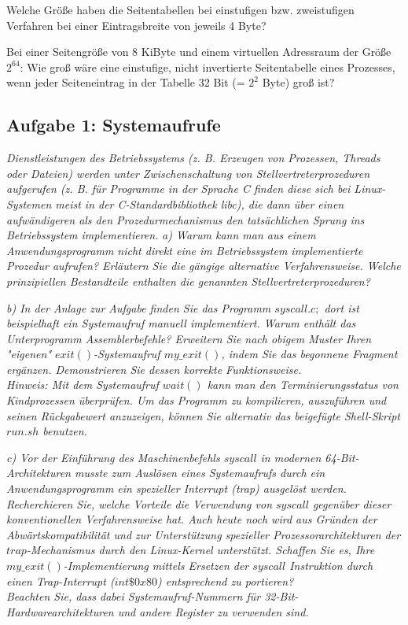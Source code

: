 \documentclass[a4paper]{article}
\begin{document}
\begin{description*}
\begin{itemize*}
        \item Welche Größe haben die Seitentabellen bei einstufigen bzw. zweistufigen Verfahren bei einer Eintragsbreite von jeweils 4 Byte?
    \end{itemize*}
    \item[Bei einer Seitengröße von 8 KiByte und einem virtuellen Adressraum der Größe $2^{64}$: Wie groß wäre eine einstufige, nicht invertierte Seitentabelle eines Prozesses, wenn jeder Seiteneintrag in der Tabelle 32 Bit (= $2^2$ Byte) groß ist?]
\end{description*}
\subsection{Aufgabe 1: Systemaufrufe}
\textit{Dienstleistungen des Betriebssystems (z. B. Erzeugen von Prozessen, Threads oder Dateien) werden unter Zwischenschaltung von Stellvertreterprozeduren aufgerufen (z. B. für Programme in der Sprache C finden diese sich bei Linux-Systemen meist in der C-Standardbibliothek libc), die dann über einen aufwändigeren als den Prozedurmechanismus den tatsächlichen Sprung ins Betriebssystem implementieren.}
\vspace{10mm}
\textit{a) Warum kann man aus einem Anwendungsprogramm nicht direkt eine im Betriebssystem implementierte Prozedur aufrufen? Erläutern Sie die gängige alternative Verfahrensweise. Welche prinzipiellen Bestandteile enthalten die genannten Stellvertreterprozeduren?}
\vspace{10mm}


\textit{b) In der Anlage zur Aufgabe finden Sie das Programm $syscall.c;$ dort ist beispielhaft ein Systemaufruf manuell implementiert. Warum enthält das Unterprogramm Assemblerbefehle? Erweitern Sie nach obigem Muster Ihren "eigenen" $exit()$-Systemaufruf $my\_exit()$, indem Sie das begonnene Fragment ergänzen. Demonstrieren Sie dessen korrekte Funktionsweise.\\
    Hinweis: Mit dem Systemaufruf $wait()$ kann man den Terminierungsstatus von Kindprozessen überprüfen. Um das Programm zu kompilieren, auszuführen und seinen Rückgabewert anzuzeigen, können Sie alternativ das beigefügte Shell-Skript $run.sh$ benutzen.
}
\vspace{10mm}

\textit{c) Vor der Einführung des Maschinenbefehls $syscall$ in modernen 64-Bit-Architekturen musste zum Auslösen eines Systemaufrufs durch ein Anwendungsprogramm ein spezieller Interrupt (trap) ausgelöst werden. Recherchieren Sie, welche Vorteile die Verwendung von $syscall$ gegenüber dieser konventionellen Verfahrensweise hat. Auch heute noch wird aus Gründen der Abwärtskompatibilität und zur Unterstützung spezieller Prozessorarchitekturen der $trap$-Mechanismus durch den Linux-Kernel unterstützt. Schaffen Sie es, Ihre $my\_exit()$-Implementierung mittels Ersetzen der $syscall$ Instruktion durch einen Trap-Interrupt ($int \$ 0x80$) entsprechend zu portieren?\\
    Beachten Sie, dass dabei Systemaufruf-Nummern für 32-Bit-Hardwarearchitekturen und andere Register zu verwenden sind.
}
\vspace{10mm}
\end{document}
